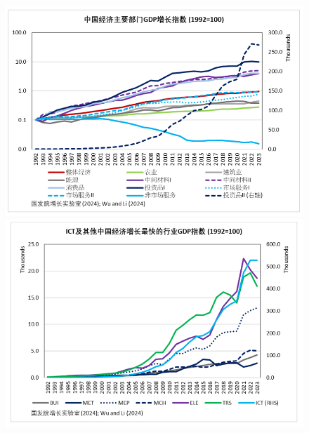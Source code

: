 \documentclass[lang=cn,10pt,green]{elegantbook}
\begin{document}
\begin{figure}[htbp]
  \centering
  \begin{minipage}[t]{0.35\textwidth}
    \includegraphics[width=\linewidth]{image/中国经济主要部门增长指数.png}
  \end{minipage}
    \begin{minipage}[t]{0.35\textwidth}
    \includegraphics[width=\linewidth]{image/ICT引领行业增长.png}
  \end{minipage}
\end{figure}
\end{document}
